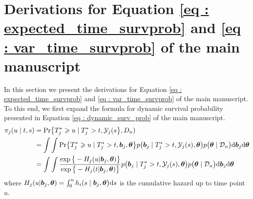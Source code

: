 \section{Derivations for Equation \ref{eq : expected_time_survprob} and \ref{eq : var_time_survprob} of the main manuscript}
In this section we present the derivations for Equation \ref{eq : expected_time_survprob} and \ref{eq : var_time_survprob} of the main manuscript. To this end, we first expand the formula for dynamic survival probability presented in Equation \ref{eq : dynamic_surv_prob} of the main manuscript.
\begin{equation}
\label{eq : dyn_surv_prob_expanded}
\begin{split}
\pi_j(u \mid t, s) &= \mbox{Pr}\big\{T^*_j \geq u \mid  T^*_j >t, \mathcal{Y}_j(s\big\}, D_n)\\
&= \int \int \mbox{Pr}\big\{T^*_j \geq u \mid  T^*_j >t, \bmath{b}_j,\bmath{\theta}\big\} p\big(\bmath{b}_j \mid T^*_j>t, \mathcal{Y}_j(s), \bmath{\theta}\big)p\big(\bmath{\theta} \mid \mathcal{D}_n\big) \rmn{d} \bmath{b}_j \rmn{d} \bmath{\theta}\\
&= \int \int \frac{\exp\big\{-H_j(u | \bmath{b}_j, \bmath{\theta})\big\}}{\exp\big\{-H_j(t | \bmath{b}_j, \bmath{\theta})\big\}} p\big(\bmath{b}_j \mid T^*_j>t, \mathcal{Y}_j(s), \bmath{\theta}\big)p\big(\bmath{\theta} \mid \mathcal{D}_n\big) \rmn{d} \bmath{b}_j \rmn{d} \bmath{\theta}
\end{split}
\end{equation}
where $H_j(u | \boldsymbol{b}_j, \boldsymbol{\theta}) = \int_0^u h_i(s \mid \boldsymbol{b}_j, \boldsymbol{\theta}\big)\mathrm{d} s$ is the cumulative hazard up to time point $u$.

